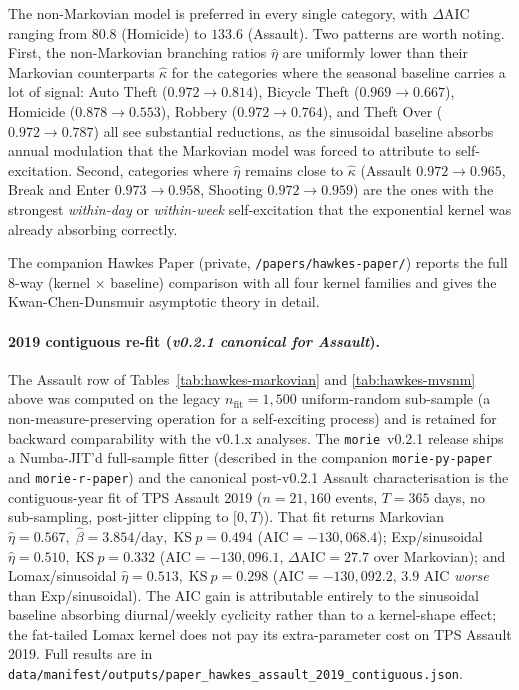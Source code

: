 \documentclass[article,shortnames,nojss]{jss}
\begin{document}
The non-Markovian model is preferred in every single category, with
$\Delta\mathrm{AIC}$ ranging from $80.8$ (Homicide) to $133.6$
(Assault).  Two patterns are worth noting.  First, the
non-Markovian branching ratios $\hat\eta$ are uniformly lower than
their Markovian counterparts $\hat\kappa$ for the categories where
the seasonal baseline carries a lot of signal: Auto Theft
($0.972 \to 0.814$), Bicycle Theft ($0.969 \to 0.667$), Homicide
($0.878 \to 0.553$), Robbery ($0.972 \to 0.764$), and Theft Over
($0.972 \to 0.787$) all see substantial reductions, as the
sinusoidal baseline absorbs annual modulation that the Markovian
model was forced to attribute to self-excitation.  Second,
categories where $\hat\eta$ remains close to $\hat\kappa$
(Assault $0.972 \to 0.965$, Break and Enter $0.973 \to 0.958$,
Shooting $0.972 \to 0.959$) are the ones with the strongest
\emph{within-day} or \emph{within-week} self-excitation that the
exponential kernel was already absorbing correctly.

The companion Hawkes Paper (private,
\texttt{/papers/hawkes-paper/}) reports the full 8-way
(kernel $\times$ baseline) comparison with all four kernel families
and gives the Kwan-Chen-Dunsmuir asymptotic theory in detail.

\paragraph{2019 contiguous re-fit (\textit{v0.2.1 canonical for Assault}).}
The Assault row of Tables~\ref{tab:hawkes-markovian} and
\ref{tab:hawkes-mvsnm} above was computed on the legacy
$n_{\text{fit}}=1{,}500$ uniform-random sub-sample (a
non-measure-preserving operation for a self-exciting process)
and is retained for backward comparability with the v0.1.x
analyses.  The \texttt{morie}~v0.2.1 release ships a
Numba-JIT'd full-sample fitter (described in the companion
\texttt{morie-py-paper} and \texttt{morie-r-paper}) and the
canonical post-v0.2.1 Assault characterisation is the
contiguous-year fit of TPS Assault 2019 ($n=21{,}160$ events,
$T=365$ days, no sub-sampling, post-jitter clipping to $[0,T)$).
That fit returns Markovian
$\hat\eta=0.567,\;\hat\beta=3.854/\text{day},\;\text{KS}~p=0.494$
($\text{AIC}=-130{,}068.4$); Exp/sinusoidal
$\hat\eta=0.510,\;\text{KS}~p=0.332$
($\text{AIC}=-130{,}096.1$, $\Delta\text{AIC}=27.7$ over
Markovian); and Lomax/sinusoidal $\hat\eta=0.513,\;\text{KS}~p=0.298$
($\text{AIC}=-130{,}092.2$, $3.9$ AIC \emph{worse} than
Exp/sinusoidal).  The AIC gain is attributable entirely to the
sinusoidal baseline absorbing diurnal/weekly cyclicity rather
than to a kernel-shape effect; the fat-tailed Lomax kernel does
not pay its extra-parameter cost on TPS Assault 2019.  Full results are in
\texttt{data/manifest/outputs/paper\_hawkes\_assault\_2019\_contiguous.json}.
\end{document}
